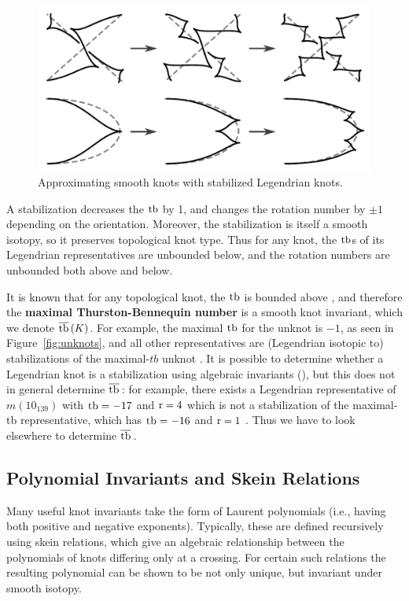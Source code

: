 \begin{figure}[ht]
    \centering
    \includegraphics[width=0.7\linewidth]{images/approximation.pdf}
    \caption{Approximating smooth knots with stabilized Legendrian knots.}
    \label{fig:approximation}
\end{figure}

A stabilization decreases the $\operatorname{tb}$ by 1, and changes the rotation number by $\pm 1$ depending on the orientation. Moreover, the stabilization is itself a smooth isotopy, so it preserves topological knot type. Thus for any knot, the $\operatorname{tb}$s of its Legendrian representatives are unbounded below, and the rotation numbers are unbounded both above and below.

It is known that for any topological knot, the $\operatorname{tb}$ is bounded above \cite{bennequin}, and therefore the \textbf{maximal Thurston-Bennequin number} is a smooth knot invariant, which we denote $\overline{\operatorname{tb}}\,(K)$.
For example, the maximal $\operatorname{tb}$ for the unknot is $-1$, as seen in Figure~\ref{fig:unknots}, and all other representatives are (Legendrian isotopic to) stabilizations of the maximal-$tb$ unknot \cite{atlas}.
It is possible to determine whether a Legendrian knot is a stabilization using algebraic invariants (\cite{chekanov}), but this does not in general determine $\overline{\operatorname{tb}}\,$: for example, there exists a Legendrian representative of $m(10_{139})$ with $\operatorname{tb} = -17$ and $\operatorname{r} = 4$ which is not a stabilization of the maximal-tb representative, which has $\operatorname{tb} = -16$ and $\operatorname{r} = 1$ \cite{atlas}. Thus we have to look elsewhere to determine $\overline{\operatorname{tb}}\,$.

\subsection{Polynomial Invariants and Skein Relations}\label{subsec:kauffman}

Many useful knot invariants take the form of Laurent polynomials (i.e., having both positive and negative exponents). Typically, these are defined recursively using skein relations, which give an algebraic relationship between the polynomials of knots differing only at a crossing. For certain such relations the resulting polynomial can be shown to be not only unique, but invariant under smooth isotopy.

